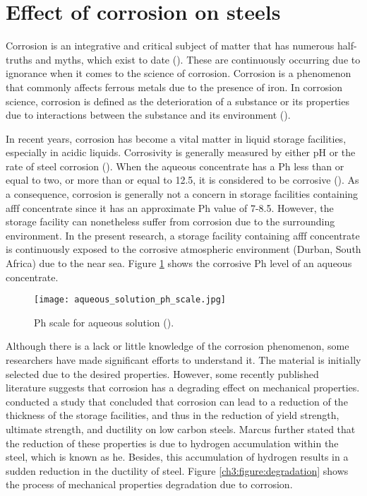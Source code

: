 \section{Effect of corrosion on steels}
\label{ch3:anchor:section:effects}
Corrosion is an integrative and critical subject of matter that has numerous half-truths and myths, which exist to date (\cite{mcarthur2004engineering}). These are continuously occurring due to ignorance when it comes to the science of corrosion.  Corrosion is a phenomenon that commonly affects ferrous metals due to the presence of iron. In corrosion science, corrosion is defined as the deterioration of a substance or its properties due to interactions between the substance and its environment (\cite{chigondo2016recent}).

In recent years, corrosion has become a vital matter in liquid storage facilities, especially in acidic liquids. Corrosivity is generally measured by either pH or the rate of steel corrosion (\cite{marzorati2018green}). When the aqueous concentrate has a Ph less than or equal to two, or more than or equal to 12.5, it is considered to be corrosive (\cite{marzorati2018green}). As a consequence, corrosion is generally not a concern in storage facilities containing \acrshort{afff} concentrate since it has an approximate Ph value of 7-8.5. However, the storage facility can nonetheless suffer from corrosion due to the surrounding environment. In the present research, a storage facility containing \acrshort{afff} concentrate is continuously exposed to the corrosive atmospheric environment (Durban, South Africa) due to the near sea. Figure \ref{ch3:figure:ph} shows the corrosive Ph level of an aqueous concentrate.
 
\begin{figure}[H]
    \centering
    \texttt{[image: aqueous\_solution\_ph\_scale.jpg]}
    \caption{Ph scale for aqueous solution (\cite{marzorati2018green}).}
    \label{ch3:figure:ph}
\end{figure}

Although there is a lack or little knowledge of the corrosion phenomenon, some researchers have made significant efforts to understand it. The material is initially selected due to the desired properties. However, some recently published literature suggests that corrosion has a degrading effect on mechanical properties. \cite{li2018effect} conducted a study that concluded that corrosion can lead to a reduction of the thickness of the storage facilities, and thus in the reduction of yield strength, ultimate strength, and ductility on low carbon steels.  Marcus \cite{protopopoff2011surface} further stated that the reduction of these properties is due to hydrogen accumulation within the steel, which is known as \acrfull{he}. Besides, this accumulation of hydrogen results in a sudden reduction in the ductility of steel. Figure \ref{ch3:figure:degradation} shows the process of mechanical properties degradation due to corrosion.
 

